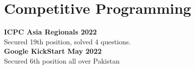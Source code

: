 \documentclass[]{m abbas resume' 2022}
\begin{document}
\begin{minipage}[t]{0.45\textwidth}
\section{Competitive Programming} 
\textbf{ICPC Asia Regionals 2022}\\
Secured 19th position, solved 4 questions. \\ 
\textbf{Google KickStart May 2022}\\
Secured 6th position all over Pakistan%


\end{minipage} 
\end{document}
